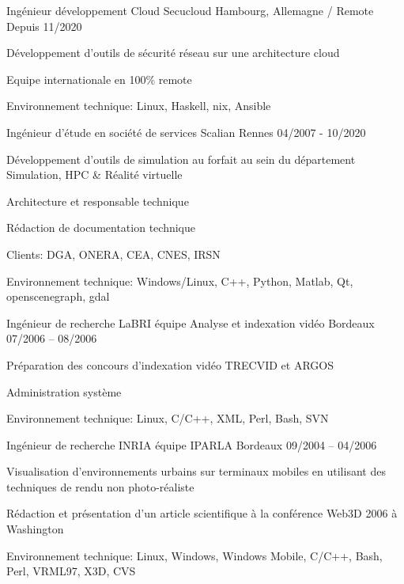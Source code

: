 \begin{cventries}
  \cventry
    {Ingénieur développement Cloud}
    {Secucloud}
    {Hambourg, Allemagne / Remote}
    {Depuis 11/2020}
    {
      \begin{cvitems}
        \item {Développement d'outils de sécurité réseau sur une architecture
            cloud}
        \item {Equipe internationale en 100\% remote}
        \item {Environnement technique: Linux, Haskell, nix, Ansible}
      \end{cvitems}
    }

  \cventry
    {Ingénieur d'étude en société de services}
    {Scalian}
    {Rennes}
    {04/2007 - 10/2020}
    {
      \begin{cvitems}
        \item {Développement d'outils de simulation au forfait au sein du
            département Simulation, HPC \& Réalité virtuelle}
        \item {Architecture et responsable technique}
        \item {Rédaction de documentation technique}
        \item {Clients: DGA, ONERA, CEA, CNES, IRSN}
        \item {Environnement technique: Windows/Linux, C++, Python, Matlab, Qt,
            openscenegraph, gdal}
      \end{cvitems}
    }

  \cventry
    {Ingénieur de recherche}
    {LaBRI équipe Analyse et indexation vidéo}
    {Bordeaux}
    {07/2006 – 08/2006}
    {
      \begin{cvitems}
        \item {Préparation des concours d'indexation vidéo TRECVID et ARGOS}
        \item {Administration système}
        \item {Environnement technique: Linux, C/C++, XML, Perl, Bash, SVN}
      \end{cvitems}
    }

  \cventry
    {Ingénieur de recherche}
    {INRIA équipe IPARLA}
    {Bordeaux}
    {09/2004 – 04/2006}
    {
      \begin{cvitems}
        \item {Visualisation d'environnements urbains sur terminaux mobiles en
            utilisant des techniques de rendu non photo-réaliste}
        \item {Rédaction et présentation d'un article scientifique à la
            conférence Web3D 2006 à Washington}
        \item {Environnement technique: Linux, Windows, Windows Mobile, C/C++,
            Bash, Perl, VRML97, X3D, CVS}
      \end{cvitems}
    }


\end{cventries}

